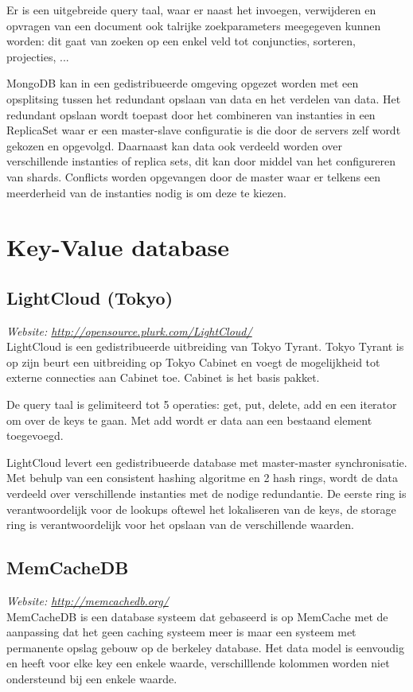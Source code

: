 Er is een uitgebreide query taal, waar er naast het invoegen, verwijderen en opvragen van een document ook talrijke zoekparameters meegegeven kunnen worden: dit gaat van zoeken op een enkel veld tot conjuncties, sorteren, projecties, ... 

MongoDB kan in een gedistribueerde omgeving opgezet worden met een opsplitsing tussen het redundant opslaan van data en het verdelen van data. Het redundant opslaan wordt toepast door het combineren van instanties in een ReplicaSet waar er een master-slave configuratie is die door de servers zelf wordt gekozen en opgevolgd. Daarnaast kan data ook verdeeld worden over verschillende instanties of replica sets, dit kan door middel van het configureren van shards. 
Conflicts worden opgevangen door de master waar er telkens een meerderheid van de instanties nodig is om deze te kiezen. 

\section{Key-Value database}
\subsection{LightCloud (Tokyo)}
\textit{Website: \url{http://opensource.plurk.com/LightCloud/}}\\
LightCloud is een gedistribueerde uitbreiding van Tokyo Tyrant. Tokyo Tyrant is op zijn beurt een uitbreiding op Tokyo Cabinet en voegt de mogelijkheid tot externe connecties aan Cabinet toe. Cabinet is het basis pakket. 

De query taal is gelimiteerd tot 5 operaties: get, put, delete, add en een iterator om over de keys te gaan. Met add wordt er data aan een bestaand element toegevoegd. 

LightCloud levert een gedistribueerde database met master-master synchronisatie. Met behulp van een consistent hashing algoritme en 2 hash rings, wordt de data verdeeld over verschillende instanties met de nodige redundantie. De eerste ring is verantwoordelijk voor de lookups oftewel het lokaliseren van de keys, de storage ring is verantwoordelijk voor het opslaan van de verschillende waarden. 

\subsection{MemCacheDB}
\textit{Website: \url{http://memcachedb.org/}}\\
MemCacheDB is een database systeem dat gebaseerd is op MemCache met de aanpassing dat het geen caching systeem meer is maar een systeem met permanente opslag gebouw op de berkeley database. Het data model is eenvoudig en heeft voor elke key een enkele waarde, verschilllende kolommen worden niet ondersteund bij een enkele waarde. 

